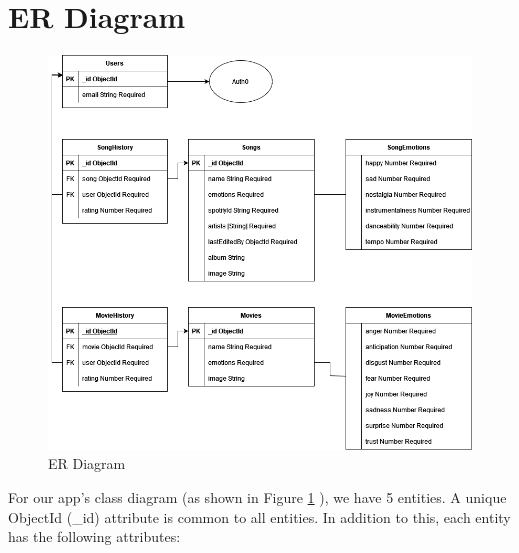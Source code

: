 \section{ER Diagram}
\begin{figure}[H]
\centering
\includegraphics[width=\textwidth]{imgs/erDiagram.png}
\caption{ER Diagram}
\label{fig: erDiagram}
\end{figure}
For our app's class diagram (as shown in Figure \ref{fig: erDiagram} ), we have 5 entities. A unique ObjectId (\_id) attribute is common to all entities. In addition to this, each entity has the following attributes:
